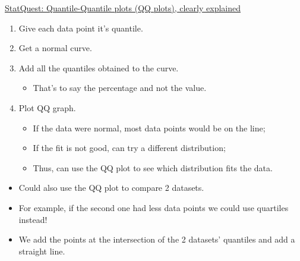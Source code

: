 \documentclass[12pt, titlepage, french]{report}
\begin{document}
\begin{YTB_SUMM}{\href{https://www.youtube.com/watch?v=okjYjClSjOg&list=PLblh5JKOoLUIcdlgu78MnlATeyx4cEVeR&index=20}{StatQuest: Quantile-Quantile plots (QQ plots), clearly explained}}
\begin{enumerate}
	\item	Give each data point it's quantile.
	\item	Get a normal curve.
	\item	Add all the quantiles obtained to the curve.
	\begin{itemize}
		\item	That's to say the percentage and not the value.
	\end{itemize}
	\item	Plot QQ graph.
	\begin{itemize}
		\item	If the data were normal, most data points would be on the line;
		\item	If the fit is not good, can try a different distribution;
		\item	Thus, can use the QQ plot to see which distribution fits the data.
	\end{itemize}
\end{enumerate}
\begin{itemize}
	\item	Could also use the QQ plot to compare 2 datasets.
	\item	For example, if the second one had less data points we could use quartiles instead!
	\item	We add the points at the intersection of the 2 datasets' quantiles and add a straight line.
\end{itemize}
\end{YTB_SUMM}
\end{document}
